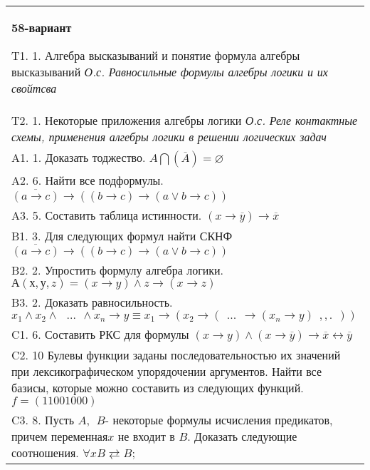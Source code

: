 \documentclass{article}
\begin{document}
\begin{tabular}{m{17cm}}
\textbf{58-вариант}
\newline

T1. 1. Алгебра высказываний и понятие формула алгебры высказываний \emph{О.с. Равносильные формулы алгебры логики и их свойтсва} \\
T2. 1. Некоторые приложения алгебры логики \emph{О.с. Реле контактные схемы, применения алгебры логики в решении логических задач} \\
A1. 1. Доказать тоджество. \(A\bigcap(\overline{A}) = \varnothing\) \\
A2. 6. Найти все подформулы. \(\overline{(a \rightarrow c)} \rightarrow \left( (b \rightarrow c) \rightarrow (a \vee b \rightarrow c) \right)\) \\
A3. 5. Составить таблица истинности. \((x \rightarrow \overline{y}) \rightarrow \overline{x}\) \\
B1. 3. Для следующих формул найти СКНФ \(\overline{(a \rightarrow c)} \rightarrow \left( (b \rightarrow c) \rightarrow (a \vee b \rightarrow c) \right)\) \\
B2. 2. Упростить формулу алгебра логики. \(А(х,у,z) = (x \rightarrow y) \land z \rightarrow (x \rightarrow z)\) \\
B3. 2. Доказать равносильность.\(x_{1} \land x_{2} \land \ \ \ ...\ \  \land x_{n} \rightarrow y \equiv x_{1} \rightarrow (x_{2} \rightarrow (\ \ ...\ \  \rightarrow (x_{n} \rightarrow y)\ \ ,,.\ \ ))\) \\
C1. 6. Составить РКС для формулы \((x \rightarrow y) \land (x \rightarrow \overline{y}) \rightarrow \overline{x} \leftrightarrow \overline{y}\) \\
C2. 10 Булевы функции заданы последовательностью их значений при лексикографическом упорядочении аргументов. Найти все базисы, которые можно составить из следующих функций. \(f = (11001000)\) \\
C3. 8. Пусть \(A,\ \ B\)- некоторые формулы исчисления предикатов, причем переменная\(x\) не входит в \(B\). Доказать следующие соотношения. \(\forall xB \rightleftarrows B\); \\

\end{tabular}
\vspace{1cm}
\end{document}
